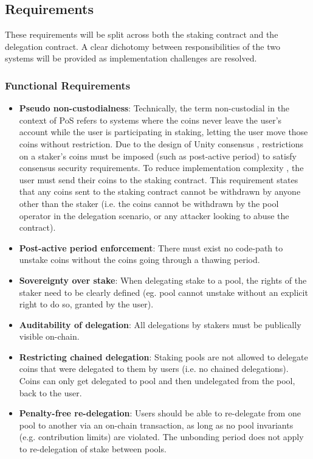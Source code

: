 \subsection{Requirements}

These requirements will be split across both the staking contract and the delegation contract. A clear dichotomy between responsibilities of the two systems will be provided as implementation challenges are resolved. 

\subsubsection{Functional Requirements}
\begin{itemize}
    \item \textbf{Pseudo non-custodialness}: Technically, the term non-custodial in the context of PoS refers to systems where the coins never leave the user's account while the user is participating in staking, letting the user move those coins without restriction. Due to the design of Unity consensus \cite{WZS19}, restrictions on a staker's coins must be imposed (such as post-active period) to satisfy consensus security requirements. To reduce implementation complexity \cite{ZZW19}, the user must send their coins to the staking contract. This requirement states that any coins sent to the staking contract cannot be withdrawn by anyone other than the staker (i.e. the coins cannot be withdrawn by the pool operator in the delegation scenario, or any attacker looking to abuse the contract).
    \item \textbf{Post-active period enforcement}: There must exist no code-path to unstake coins without the coins going through a thawing period. 
    \item \textbf{Sovereignty over stake}: When delegating stake to a pool, the rights of the staker need to be clearly defined (eg. pool cannot unstake without an explicit right to do so, granted by the user).  
    \item \textbf{Auditability of delegation}: All delegations by stakers must be publically visible on-chain. 
    \item \textbf{Restricting chained delegation}: Staking pools are not allowed to delegate coins that were delegated to them by users (i.e. no chained delegations). Coins can only get delegated to pool and then undelegated from the pool, back to the user.  
    \item \textbf{Penalty-free re-delegation}: Users should be able to re-delegate from one pool to another via an on-chain transaction, as long as no pool invariants (e.g. contribution limits) are violated. The unbonding period does not apply to re-delegation of stake between pools. 
\end{itemize}

